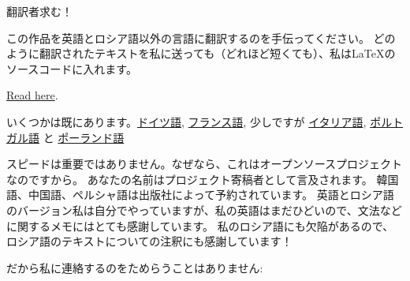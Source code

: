 \vspace*{\fill}

\Huge 翻訳者求む！

\normalsize

\bigskip
\bigskip
\bigskip

この作品を英語とロシア語以外の言語に翻訳するのを手伝ってください。
どのように翻訳されたテキストを私に送っても（どれほど短くても）、私はLaTeXのソースコードに入れます。

\href{https://github.com/DennisYurichev/RE-for-beginners/blob/master/Translation.md}{Read here}.

いくつかは既にあります。\href{https://beginners.re/RE4B-DE.pdf}{ドイツ語},
\href{https://beginners.re/RE4B-FR.pdf}{フランス語}, 少しですが
\href{https://yurichev.com/tmp/RE4B-IT-partial.pdf}{イタリア語},
\href{https://yurichev.com/tmp/RE4B-PTBR-lite2.pdf}{ポルトガル語} と
\href{https://yurichev.com/tmp/RE4B-PL.pdf}{ポーランド語}

スピードは重要ではありません。なぜなら、これはオープンソースプロジェクトなのですから。
あなたの名前はプロジェクト寄稿者として言及されます。
韓国語、中国語、ペルシャ語は出版社によって予約されています。
英語とロシア語のバージョン私は自分でやっていますが、私の英語はまだひどいので、文法などに関するメモにはとても感謝しています。
私のロシア語にも欠陥があるので、ロシア語のテキストについての注釈にも感謝しています！

だから私に連絡するのをためらうことはありません: \GTT{\EMAIL}

\vspace*{\fill}
\vfill
